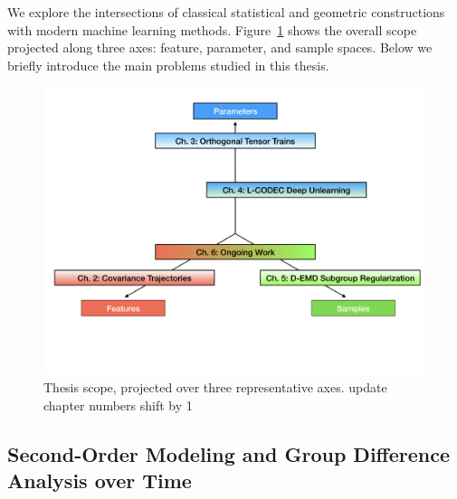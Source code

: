 We explore the intersections of classical statistical and geometric constructions with modern machine learning methods. 
Figure~\ref{fig:scope} shows the overall scope projected along three axes: feature, parameter, and sample spaces.
Below we briefly introduce the main problems studied in this thesis.
\begin{figure}[!ht]
    \centering
    \includegraphics[width=0.95\linewidth]{1_intro/figs/thesis_scope.png}
    \caption[Thesis Scope]{Thesis scope, projected over three representative axes. {\color{red} update chapter numbers shift by 1}}
    \label{fig:scope}
\end{figure}

\subsection{Second-Order Modeling and Group Difference Analysis over Time}

